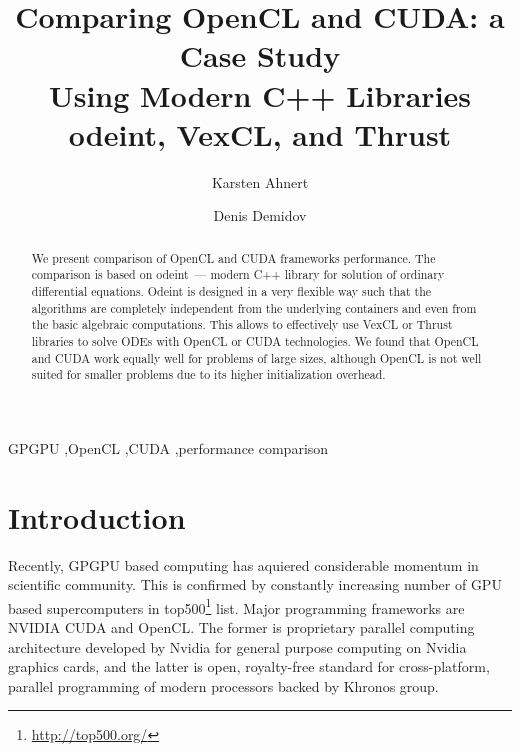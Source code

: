 \documentclass[1p]{elsarticle}
\begin{document}
\begin{frontmatter}

\title{Comparing OpenCL and CUDA: a Case Study\\ Using Modern C++ Libraries
odeint, VexCL, and Thrust}

\author{Karsten Ahnert}
\address{
Institut f\"ur Physik und Astronomie, Universit\"at Potsdam,\\
Karl-Liebknecht-Strasse 24/25, 14476 Potsdam-Golm, Germany
}

\author{Denis Demidov}
\address{
Kazan Branch of Joint Supercomputer Center,
Russian Academy of Sciences,\\
Lobachevsky st. 2/31, 420008 Kazan, Russia
}

\begin{abstract}
    We present comparison of OpenCL and CUDA frameworks performance. The
    comparison is based on odeint~--- modern C++ library for solution of
    ordinary differential equations. Odeint is designed in a very flexible way
    such that the algorithms are completely independent from the underlying
    containers and even from the basic algebraic computations. This allows to
    effectively use VexCL or Thrust libraries to solve ODEs with OpenCL or CUDA
    technologies. We found that OpenCL and CUDA work equally well for problems
    of large sizes, although OpenCL is not well suited for smaller problems due
    to its higher initialization overhead.
\end{abstract}

\begin{keyword}
    GPGPU \sep OpenCL \sep CUDA \sep performance comparison
\end{keyword}

\end{frontmatter}

\section{Introduction}

Recently, GPGPU based computing has aquiered considerable momentum in
scientific community. This is confirmed by constantly increasing number of GPU
based supercomputers in
top500\footnote{\href{http://top500.org/}{http://top500.org/}} list. Major
programming frameworks are NVIDIA CUDA and OpenCL.  The former is proprietary
parallel computing architecture developed by Nvidia for general purpose
computing on Nvidia graphics cards, and the latter is open, royalty-free
standard for cross-platform, parallel programming of modern processors backed
by Khronos group.
\end{document}
